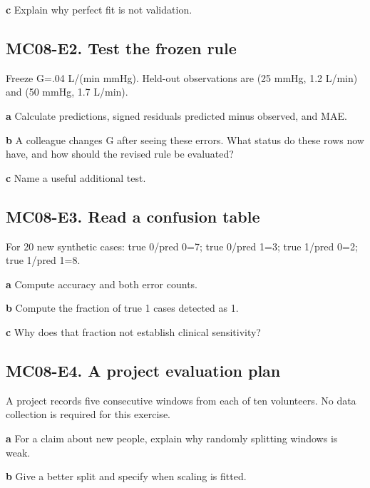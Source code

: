 \documentclass[11pt,letterpaper]{article}
\theoremstyle{definition}\newtheorem{definition}{Definition}\newtheorem{example}{Example}
\numberwithin{equation}{section}
\begin{document}
\textbf{c} Explain why perfect fit is not validation.

\par\noindent\begin{minipage}{\linewidth}
\subsection*{MC08-E2. Test the frozen rule}
Freeze G=\allowbreak{}.04 L/(min mmHg). Held-out observations are (25 mmHg, 1.2 L/min) and (50 mmHg, 1.7 L/min).

\textbf{a} Calculate predictions, signed residuals predicted minus observed, and MAE.

\end{minipage}\par\medskip
\textbf{b} A colleague changes G after seeing these errors. What status do these rows now have, and how should the revised rule be evaluated?

\textbf{c} Name a useful additional test.

\par\noindent\begin{minipage}{\linewidth}
\subsection*{MC08-E3. Read a confusion table}
For 20 new synthetic cases: true 0/pred 0=\allowbreak{}7; true 0/pred 1=\allowbreak{}3; true 1/pred 0=\allowbreak{}2; true 1/pred 1=\allowbreak{}8.

\textbf{a} Compute accuracy and both error counts.

\end{minipage}\par\medskip
\textbf{b} Compute the fraction of true 1 cases detected as 1.

\textbf{c} Why does that fraction not establish clinical sensitivity?

\par\noindent\begin{minipage}{\linewidth}
\subsection*{MC08-E4. A project evaluation plan}
A project records five consecutive windows from each of ten volunteers. No data collection is required for this exercise.

\textbf{a} For a claim about new people, explain why randomly splitting windows is weak.

\end{minipage}\par\medskip
\textbf{b} Give a better split and specify when scaling is fitted.
\end{document}
